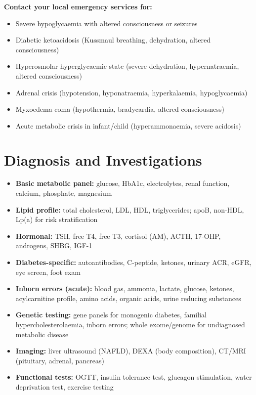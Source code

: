\textbf{Contact your local emergency services for:}
\begin{itemize}
    \item Severe hypoglycaemia with altered consciousness or seizures
    \item Diabetic ketoacidosis (Kussmaul breathing, dehydration, altered consciousness)
    \item Hyperosmolar hyperglycaemic state (severe dehydration, hypernatraemia, altered consciousness)
    \item Adrenal crisis (hypotension, hyponatraemia, hyperkalaemia, hypoglycaemia)
    \item Myxoedema coma (hypothermia, bradycardia, altered consciousness)
    \item Acute metabolic crisis in infant/child (hyperammonaemia, severe acidosis)
\end{itemize}

\section*{Diagnosis and Investigations}
\begin{itemize}
    \item \textbf{Basic metabolic panel:} glucose, HbA1c, electrolytes, renal function, calcium, phosphate, magnesium
    \item \textbf{Lipid profile:} total cholesterol, LDL, HDL, triglycerides; apoB, non-HDL, Lp(a) for risk stratification
    \item \textbf{Hormonal:} TSH, free T4, free T3, cortisol (AM), ACTH, 17-OHP, androgens, SHBG, IGF-1
    \item \textbf{Diabetes-specific:} autoantibodies, C-peptide, ketones, urinary ACR, eGFR, eye screen, foot exam
    \item \textbf{Inborn errors (acute):} blood gas, ammonia, lactate, glucose, ketones, acylcarnitine profile, amino acids, organic acids, urine reducing substances
    \item \textbf{Genetic testing:} gene panels for monogenic diabetes, familial hypercholesterolaemia, inborn errors; whole exome/genome for undiagnosed metabolic disease
    \item \textbf{Imaging:} liver ultrasound (NAFLD), DEXA (body composition), CT/MRI (pituitary, adrenal, pancreas)
    \item \textbf{Functional tests:} OGTT, insulin tolerance test, glucagon stimulation, water deprivation test, exercise testing
\end{itemize}

